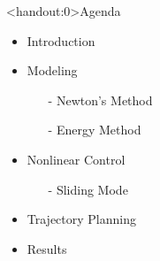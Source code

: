 \begin{frame}<handout:0>{Agenda}{}
  \begin{itemize}
    \item Introduction
    \item Modeling
    \begin{itemize}
      \item[-] Newton's Method
      \item[-] Energy Method
    \end{itemize}
    \item Nonlinear Control
    \begin{itemize}
      \item[-] Sliding Mode
    \end{itemize}
    \item Trajectory Planning
    \item Results
  \end{itemize}
\end{frame}